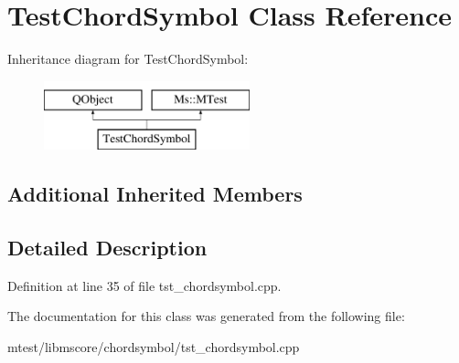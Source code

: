 \hypertarget{class_test_chord_symbol}{}\section{Test\+Chord\+Symbol Class Reference}
\label{class_test_chord_symbol}
Inheritance diagram for Test\+Chord\+Symbol\+:\begin{figure}[H]
\begin{center}
\leavevmode
\includegraphics[height=2.000000cm]{class_test_chord_symbol}
\end{center}
\end{figure}
\subsection*{Additional Inherited Members}


\subsection{Detailed Description}


Definition at line 35 of file tst\+\_\+chordsymbol.\+cpp.



The documentation for this class was generated from the following file\+:\begin{DoxyCompactItemize}
\item 
mtest/libmscore/chordsymbol/tst\+\_\+chordsymbol.\+cpp\end{DoxyCompactItemize}
